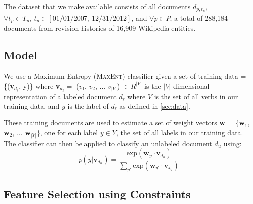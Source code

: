 The dataset that we make available consists of all documents $d_{p, t_p}$, $\forall t_p \in T_p,\ t_p \in [01/01/2007,\ 12/31/2012]$, and $\forall p \in P$; a total of 288,184 documents from revision histories of 16,909 Wikipedia entities.



\subsection{Model}
We use a Maximum Entropy (\textsc{MaxEnt}) classifier given a set of training data = \{(\textbf{v}$_{d_{\ell}}$, y)\} where \textbf{v}$_{d_{\ell}} =$ ($v_1$, $v_2$, ... $v_{|V|}$) $\in R^{|V|}$ is the $|V|$-dimensional representation of a labeled document $d_{\ell}$ where $V$ is the set of all verbs in our training data, and $y$ is the label of $d_{\ell}$ as defined in \ref{sec:data}.

These training documents are used to estimate a set of weight vectors \textbf{w} = \{\textbf{w}$_1$, \textbf{w}$_2$, ... \textbf{w}$_{|Y|}$\}, one for each label $y \in Y$, the set of all labels in our training data. The classifier can then be applied to classify an unlabeled document $d_{\textit{u}}$ using: 
\scriptsize
 \begin{equation}
	p(y|\textbf{v}_{d_{\textit{u}}}) = \frac{\mathrm{exp}  (\textbf{w}_{y} \cdot \textbf{v}_{d_{\textit{u}}})}{\sum_{y'} \mathrm{exp} (\textbf{w}_{y'} \cdot \textbf{v}_{d_{\textit{u}}})} \label{eqn:maxent}
\end{equation}
\normalsize
\subsection{Feature Selection using Constraints}

